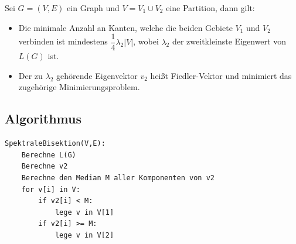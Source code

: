 \begin{mysatz*}
Sei $G=(V,E)$ ein Graph und $V=V_1\cup V_2$ eine Partition, dann gilt:
\begin{itemize}
	\item Die minimale Anzahl an Kanten, welche die beiden Gebiete $V_1$ und $V_2$ verbinden ist mindestens $\dfrac{1}{4}\lambda_2 |V|$, wobei $\lambda_2$ der zweitkleinste Eigenwert von $L(G)$ ist.
	\item Der zu $\lambda_2$ gehörende Eigenvektor $v_2$ heißt Fiedler-Vektor und minimiert das zugehörige Minimierungsproblem.
\end{itemize}
\end{mysatz*}

\subsection{Algorithmus}
\begin{lstlisting}
SpektraleBisektion(V,E):
	Berechne L(G)
	Berechne v2
	Berechne den Median M aller Komponenten von v2
	for v[i] in V:
		if v2[i] < M:
			lege v in V[1]
		if v2[i] >= M:
			lege v in V[2]
\end{lstlisting}